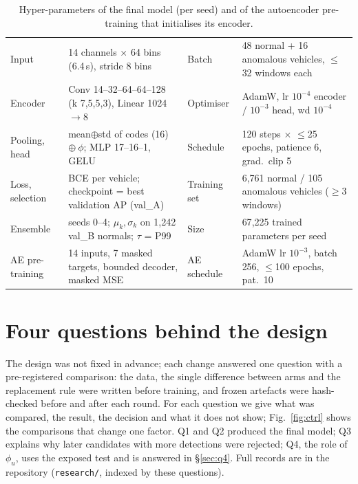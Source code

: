 \documentclass[10pt,a4paper,twocolumn]{article}
\begin{document}
\begin{table}[t]\centering\footnotesize\setlength{\tabcolsep}{3pt}
\caption{Hyper-parameters of the final model (per seed) and of the autoencoder pre-training that initialises its encoder.}\label{tab:hp}
\begin{tabular}{@{}llll@{}}\toprule
Input & 14 channels $\times$ 64 bins (6.4\,s), stride 8 bins & Batch & 48 normal + 16 anomalous vehicles, $\le$32 windows each \\
Encoder & Conv 14--32--64--64--128 (k 7,5,5,3), Linear 1024$\to$8 & Optimiser & AdamW, lr $10^{-4}$ encoder / $10^{-3}$ head, wd $10^{-4}$ \\
Pooling, head & mean$\oplus$std of codes (16) $\oplus\ \phi$; MLP 17--16--1, GELU & Schedule & 120 steps $\times$ $\le$25 epochs, patience 6, grad.\ clip 5 \\
Loss, selection & BCE per vehicle; checkpoint = best validation AP (val\_A) & Training set & 6{,}761 normal / 105 anomalous vehicles ($\ge$3 windows) \\
Ensemble & seeds 0--4; $\mu_k,\sigma_k$ on 1{,}242 val\_B normals; $\tau$ = P99 & Size & 67{,}225 trained parameters per seed \\\midrule
AE pre-training & 14 inputs, 7 masked targets, bounded decoder, masked MSE & AE schedule & AdamW lr $10^{-3}$, batch 256, $\le$100 epochs, pat.\ 10 \\\bottomrule
\end{tabular}\end{table}

\section{Four questions behind the design}\label{sec:q}
The design was not fixed in advance; each change answered one question with a pre-registered comparison: the data, the single difference between arms and the replacement rule were written before training, and frozen artefacts were hash-checked before and after each round. For each question we give what was compared, the result, the decision and what it does not show; Fig.~\ref{fig:ctrl} shows the comparisons that change one factor. Q1 and Q2 produced the final model; Q3 explains why later candidates with more detections were rejected; Q4, the role of $\phi_u$, uses the exposed test and is answered in \S\ref{sec:q4}. Full records are in the repository (\texttt{research/}, indexed by these questions).
\end{document}
